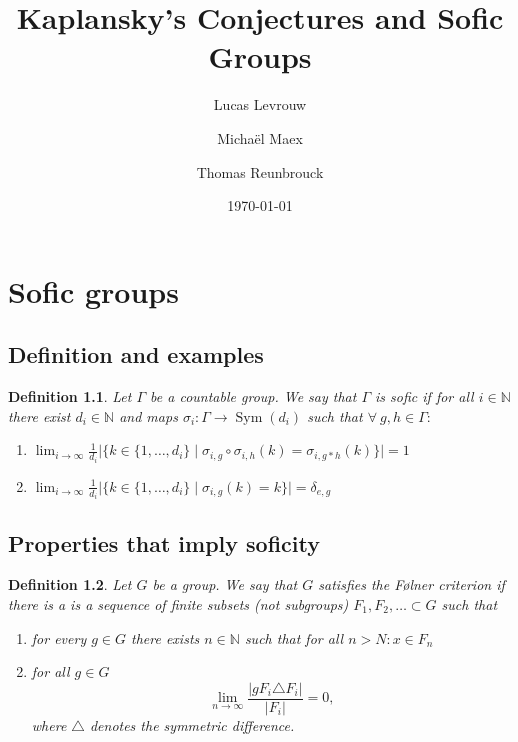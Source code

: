 \documentclass[a4paper]{memoir}
\author{Lucas Levrouw \and Michaël Maex \and Thomas Reunbrouck}
\title{Kaplansky's Conjectures and Sofic Groups}
\date{\today}
\newcommand{\N}{\mathbb{N}}
\newtheorem{definition}{Definition}
\DeclareMathOperator{\sym}{Sym}
\begin{document}
    \maketitle
    \chapter{Sofic groups}

\section{Definition and examples}

    \begin{definition}
        Let $\Gamma$ be a countable group. We say that $\Gamma$ is sofic if for all $i\in \N$ there exist $d_i \in \N$ and maps $\sigma_i : \Gamma \to \sym(d_i)$ such that $\forall\ g, h \in \Gamma:$
        \begin{enumerate}
            \item $\displaystyle \lim_{i\to \infty} \frac{1}{d_i} \big|\big\{k \in \{1, \dots, d_i\} \mid \sigma_{i,g} \circ \sigma_{i,h}(k) = \sigma_{i, g*h} (k) \big\}\big| = 1$
            \item $\displaystyle \lim_{i\to \infty} \frac{1}{d_i}  \big|\big\{k \in \{1, \dots, d_i\} \mid \sigma_{i,g}(k) = k \big\}\big| = \delta_{e,g}$
        \end{enumerate}
    \end{definition}




    \section{Properties that imply soficity}
    \begin{definition}\cite{noauthor_folner_2019}
        Let $G$ be a group. We say that $G$ satisfies the Følner criterion if there is a is a sequence of finite subsets (not subgroups) $F_1, F_2, \dots \subset G$ such that 
        \begin{enumerate}
            \item for every $g \in G$ there exists $n \in \N$ such that for all $n > N: x \in F_n$
            \item for all $g \in G$ 
            $$\lim_{n\to \infty} \frac{\left| gF_i \triangle F_i \right|}{\left| F_i \right|} = 0, $$
            where $\triangle$ denotes the symmetric difference.
        \end{enumerate}
    \end{definition}
\end{document}
